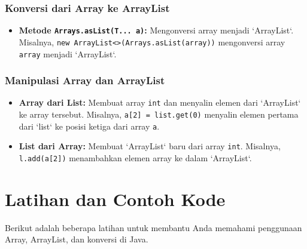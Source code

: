 \subsubsection{Konversi dari Array ke ArrayList}

\begin{itemize}
	\item \textbf{Metode \texttt{Arrays.asList(T... a)}:} Mengonversi array menjadi `ArrayList`. Misalnya, \texttt{new ArrayList<>(Arrays.asList(array))} mengonversi array \texttt{array} menjadi `ArrayList`.
\end{itemize}

\subsubsection{Manipulasi Array dan ArrayList}

\begin{itemize}
	\item \textbf{Array dari List:} Membuat array \texttt{int} dan menyalin elemen dari `ArrayList` ke array tersebut. Misalnya, \texttt{a[2] = list.get(0)} menyalin elemen pertama dari `list` ke posisi ketiga dari array \texttt{a}.
	\item \textbf{List dari Array:} Membuat `ArrayList` baru dari array \texttt{int}. Misalnya, \texttt{l.add(a[2])} menambahkan elemen array ke dalam `ArrayList`.
\end{itemize}

\section{Latihan dan Contoh Kode}

Berikut adalah beberapa latihan untuk membantu Anda memahami penggunaan Array, ArrayList, dan konversi di Java.

